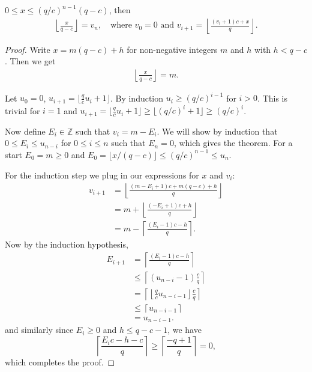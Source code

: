 \begin{theorem}
   $0\le x \le (q/c)^{n-1}(q-c)$,
   then
   \begin{align}
      \left\lfloor\frac{x}{q-c}\right\rfloor = v_n,
      \quad
      \text{where } v_0 = 0 \text{ and }
      v_{i+1} = \left\lfloor\frac{(v_i+1)c+x}{q}\right\rfloor.
   \end{align}
\end{theorem}
\begin{proof}
   Write $x = m(q-c)+h$ for non-negative integers $m$ and $h$ with $h<q-c$.
   Then we get
   \begin{align}
      \left\lfloor\frac{x}{q-c}\right\rfloor = m.
      \label{eq:floor}
   \end{align}

   Let $u_0=0$, $u_{i+1} = \lfloor\frac{q}{c}u_i+1\rfloor$.
   By induction $u_i \ge (q/c)^{i-1}$ for $i>0$.
   This is trivial for $i=1$ and $u_{i+1}=\lfloor \frac qc u_i +1\rfloor \ge \lfloor (q/c)^i + 1 \rfloor \ge (q/c)^i$.

   Now define $E_i\in\mathbb Z$ such that $v_i = m - E_i$.
   We will show by induction that $0\le E_{i} \le u_{n-i}$ for $0\le i\le n$ such that $E_n = 0$, which gives the theorem.
   For a start $E_0=m\ge 0$ and $E_0 = \lfloor x/(q-c)\rfloor \le (q/c)^{n-1} \le u_n$.

   For the induction step we plug in our expressions for $x$ and $v_i$:
   \begin{align*}
      v_{i+1}
      &= \left\lfloor \frac{(m-E_i+1)c+m(q-c)+h}{q}\right\rfloor
    \\&=
    m
    +
    \left\lfloor \frac{(- E_i+1)c +h}{q}\right\rfloor
    \\&=
    m
    - \left\lceil \frac{(E_i-1)c - h}{q}\right\rceil.
   \end{align*}
   Now by the induction hypothesis,
   \begin{align*}
      E_{i+1}
      &= \left\lceil \frac{(E_i-1)c - h}{q}\right\rceil
    \\&\le\left\lceil (u_{n-i}-1)\frac{c}{q}\right\rceil
    \\&= \left\lceil \left\lfloor \frac{q}{c}u_{n-i-1} \right\rfloor \frac{c}{q}\right\rceil
    \\&\le \left\lceil u_{n-i-1}\right\rceil
    \\&= u_{n-i-1}.
   \end{align*}
   and similarly since $E_i \ge 0$ and $h\le q-c-1$,
   we have
   $$\left\lceil \frac{E_ic - h - c}{q}\right\rceil \ge
   \left\lceil \frac{- q + 1}{q}\right\rceil = 0,$$
   which completes the proof.
\end{proof}
